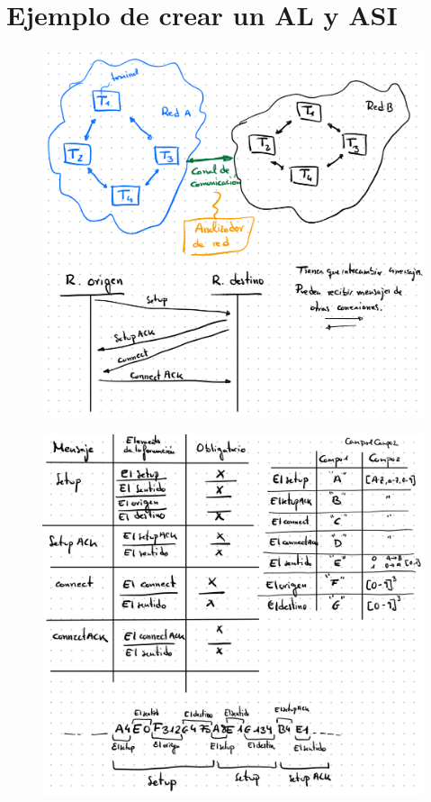 \documentclass[12pt]{report} %
\begin{document}
\section{Ejemplo de crear un AL y ASI}

\begin{figure}[H]
	{\includegraphics[scale=.2]{image-20210305192603381.png}}
\end{figure}

\begin{figure}[H]
	{\includegraphics[scale=.3]{image-20210305192620642.png}}
\end{figure}
\end{document}
